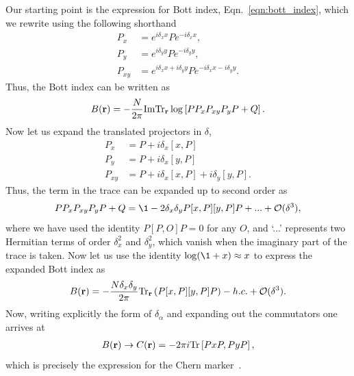 Our starting point is the expression for Bott index, Eqn.~\ref{eqn:bott_index}, which we rewrite using the following shorthand
\begin{align}
	P_x &= e^{i\delta_x x} P e^{-i\delta_x x},\\
	P_y &= e^{i\delta_y y} P e^{-i\delta_y y},\\
	P_{xy} &= e^{i\delta_x x +i\delta_y y} P e^{-i\delta_x x - i\delta_y y}.
\end{align}
Thus, the Bott index can be written as
\begin{align}
	B(\textbf r) = - \frac{N}{2\pi} \textup{Im} \textup{Tr}_{\textbf r} \log \left [ 
		P P_x P_{xy} P_y P + Q
	\right ].
\end{align}
Now let us expand the translated projectors in $\delta$,
\begin{align}
	P_x &= P +i\delta_x [x,P] \\ 
	P_y &= P +i\delta_x [y,P] \\ 
	P_{xy} &= P +i\delta_x [x,P]+i\delta_y [y,P].
\end{align}
Thus, the term in the trace can be expanded up to second order as
\begin{align}
	P P_x P_{xy} P_y P + Q = \1 - 2 \delta_x \delta_y
	P[x,P][y,P]P + ... + \mathcal O(\delta^3),
\end{align}
where we have used the identity $P[P,O]P = 0$ for any $O$, and `...' represents two Hermitian terms of order $\delta_x^2$ and $\delta_y^2$, which vanish when the imaginary part of the trace is taken. Now let us use the identity $\log( \1 + x) \approx x$ to express the expanded Bott index as
\begin{align} \label{eqn:chern_bott_expansion}
	B(\textbf r) = - \frac{N \delta_x \delta_y} {2\pi} \textup{Tr}_{\textbf r} \left (
	P[x,P][y,P]P 
	\right ) - h.c. + \mathcal O(\delta^3).
\end{align}
Now, writing explicitly the form of $\delta_\alpha$ and expanding out the commutators one arrives at
\begin{align} \label{eqn:chern_marker}
	B(\textbf r) \rightarrow C(\textbf r) = - 2\pi i \textup{Tr} \left [
		PxP, PyP
	\right ],
\end{align}
which is precisely the expression for the Chern marker~\cite{bianco_mapping_2011}.

